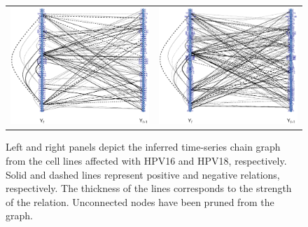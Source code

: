 \begin{figure}[h!]
\centering
\begin{tabular}{cc}
\includegraphics[scale=0.4]{Figure_11a.eps} &
\includegraphics[scale=0.4]{Figure_11b.eps}
\end{tabular}
\caption{Left and right panels depict the inferred time-series chain graph from the cell lines affected with HPV16 and HPV18, respectively. Solid and dashed lines represent positive and negative relations, respectively. The thickness of the lines corresponds to the strength of the relation. Unconnected nodes have been pruned from the graph.}
\label{fig:graph}
\end{figure}

